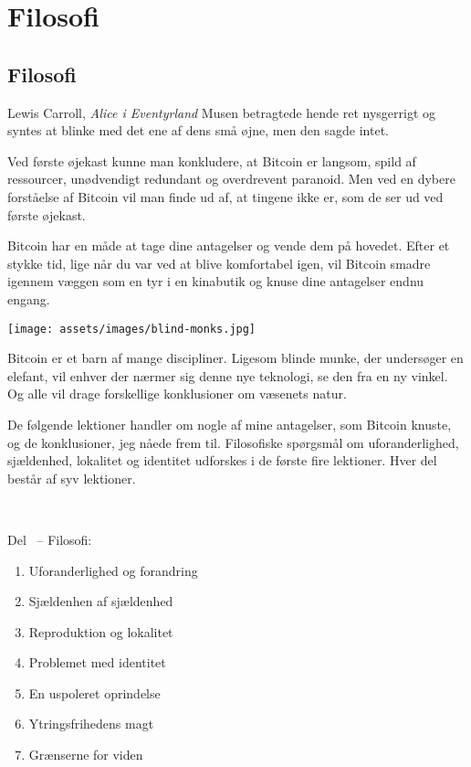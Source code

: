 \part{Filosofi}
\label{ch:filosofi}
\chapter*{Filosofi}

\begin{chapquote}{Lewis Carroll, \textit{Alice i Eventyrland}}
Musen betragtede hende ret nysgerrigt og syntes at blinke med det ene af dens 
små øjne, men den sagde intet.
\end{chapquote}

Ved første øjekast kunne man konkludere, at Bitcoin er langsom, spild af 
ressourcer, unødvendigt redundant og overdrevent paranoid. Men ved en dybere 
forståelse af Bitcoin vil man finde ud af, at tingene ikke er, som de ser ud 
ved første øjekast.

Bitcoin har en måde at tage dine antagelser og vende dem på hovedet. Efter et 
stykke tid, lige når du var ved at blive komfortabel igen, vil Bitcoin smadre 
igennem væggen som en tyr i en kinabutik og knuse dine antagelser endnu engang.

\begin{center}
  \texttt{[image: assets/images/blind-monks.jpg]}
  \label{fig:blind-monks}
\end{center}

Bitcoin er et barn af mange discipliner. Ligesom blinde munke, der undersøger en 
elefant, vil enhver der nærmer sig denne nye teknologi, se den fra en ny 
vinkel. Og alle vil drage forskellige konklusioner om væsenets natur.

De følgende lektioner handler om nogle af mine antagelser, som Bitcoin knuste, 
og de konklusioner, jeg nåede frem til. Filosofiske spørgsmål om 
uforanderlighed, sjældenhed, lokalitet og identitet udforskes i de første fire 
lektioner. Hver del består af syv lektioner.

~

\begin{samepage}
Del~\ref{ch:filosofi} -- Filosofi:

\begin{enumerate}
  \item Uforanderlighed og forandring
  \item Sjældenhen af sjældenhed
  \item Reproduktion og lokalitet
  \item Problemet med identitet
  \item En uspoleret oprindelse
  \item Ytringsfrihedens magt
  \item Grænserne for viden
\end{enumerate}
\end{samepage}

